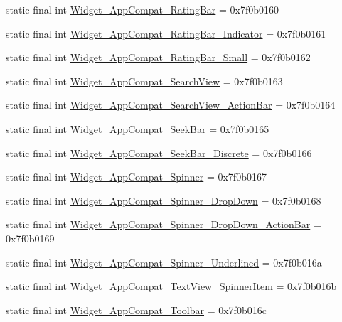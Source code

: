 \begin{CompactItemize}
static final int \hyperlink{classandroid_1_1support_1_1coreutils_1_1_r_1_1style_379a3a48d8f59e904749a5fb8ae71d1e}{Widget\_\-AppCompat\_\-RatingBar} = 0x7f0b0160
\item 
static final int \hyperlink{classandroid_1_1support_1_1coreutils_1_1_r_1_1style_4408757edd08c32ed1273f33f04f51a0}{Widget\_\-AppCompat\_\-RatingBar\_\-Indicator} = 0x7f0b0161
\item 
static final int \hyperlink{classandroid_1_1support_1_1coreutils_1_1_r_1_1style_a8a284bae178da69331734ab626069a4}{Widget\_\-AppCompat\_\-RatingBar\_\-Small} = 0x7f0b0162
\item 
static final int \hyperlink{classandroid_1_1support_1_1coreutils_1_1_r_1_1style_55bea7108b8bc427469beab09f17c315}{Widget\_\-AppCompat\_\-SearchView} = 0x7f0b0163
\item 
static final int \hyperlink{classandroid_1_1support_1_1coreutils_1_1_r_1_1style_e892bf77afddc6ba07ceb8a724a3f2a5}{Widget\_\-AppCompat\_\-SearchView\_\-ActionBar} = 0x7f0b0164
\item 
static final int \hyperlink{classandroid_1_1support_1_1coreutils_1_1_r_1_1style_d118cf3ee05fa9102bef5763b41b1995}{Widget\_\-AppCompat\_\-SeekBar} = 0x7f0b0165
\item 
static final int \hyperlink{classandroid_1_1support_1_1coreutils_1_1_r_1_1style_7868f0040d4063eb51950f8c7d144f58}{Widget\_\-AppCompat\_\-SeekBar\_\-Discrete} = 0x7f0b0166
\item 
static final int \hyperlink{classandroid_1_1support_1_1coreutils_1_1_r_1_1style_04fa9b84afac052a20ffbaf5188937e4}{Widget\_\-AppCompat\_\-Spinner} = 0x7f0b0167
\item 
static final int \hyperlink{classandroid_1_1support_1_1coreutils_1_1_r_1_1style_6ab6a687b7e2487939fc0097f47f7bdc}{Widget\_\-AppCompat\_\-Spinner\_\-DropDown} = 0x7f0b0168
\item 
static final int \hyperlink{classandroid_1_1support_1_1coreutils_1_1_r_1_1style_0bd769c1a8845ef6b8b7055363bf4078}{Widget\_\-AppCompat\_\-Spinner\_\-DropDown\_\-ActionBar} = 0x7f0b0169
\item 
static final int \hyperlink{classandroid_1_1support_1_1coreutils_1_1_r_1_1style_71be506f89527da8e07f88ee70533c15}{Widget\_\-AppCompat\_\-Spinner\_\-Underlined} = 0x7f0b016a
\item 
static final int \hyperlink{classandroid_1_1support_1_1coreutils_1_1_r_1_1style_39829467fcf8898ba49d57aac0cfa6c6}{Widget\_\-AppCompat\_\-TextView\_\-SpinnerItem} = 0x7f0b016b
\item 
static final int \hyperlink{classandroid_1_1support_1_1coreutils_1_1_r_1_1style_bfc855a9b7e3a627de2efc77a137e9ab}{Widget\_\-AppCompat\_\-Toolbar} = 0x7f0b016c

\end{CompactItemize}
